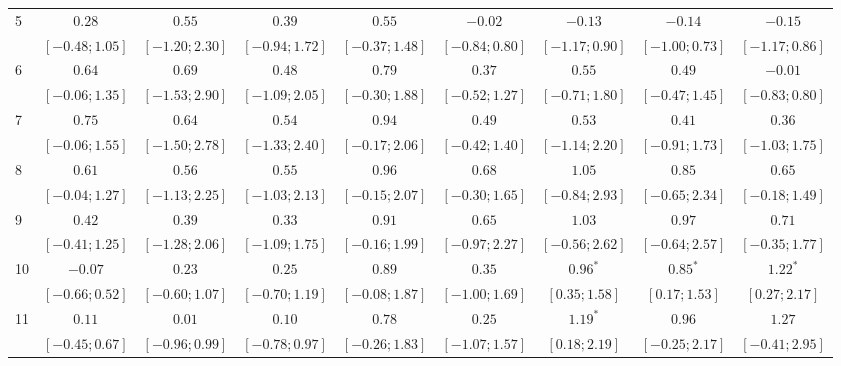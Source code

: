 \documentclass[12pt]{amsart}
\begin{document}
\begin{table}
\begin{adjustbox}{width=\textwidth}
\begin{tabular}{l c c c c | c c c c}
5  & $0.28$           & $0.55$           & $0.39$           & $0.55$           & $-0.02$          & $-0.13$          & $-0.14$          & $-0.15$          \\
   & $ [-0.48; 1.05]$ & $ [-1.20; 2.30]$ & $ [-0.94; 1.72]$ & $ [-0.37; 1.48]$ & $ [-0.84; 0.80]$ & $ [-1.17; 0.90]$ & $ [-1.00; 0.73]$ & $ [-1.17; 0.86]$ \\
6  & $0.64$           & $0.69$           & $0.48$           & $0.79$           & $0.37$           & $0.55$           & $0.49$           & $-0.01$          \\
   & $ [-0.06; 1.35]$ & $ [-1.53; 2.90]$ & $ [-1.09; 2.05]$ & $ [-0.30; 1.88]$ & $ [-0.52; 1.27]$ & $ [-0.71; 1.80]$ & $ [-0.47; 1.45]$ & $ [-0.83; 0.80]$ \\
7  & $0.75$           & $0.64$           & $0.54$           & $0.94$           & $0.49$           & $0.53$           & $0.41$           & $0.36$           \\
   & $ [-0.06; 1.55]$ & $ [-1.50; 2.78]$ & $ [-1.33; 2.40]$ & $ [-0.17; 2.06]$ & $ [-0.42; 1.40]$ & $ [-1.14; 2.20]$ & $ [-0.91; 1.73]$ & $ [-1.03; 1.75]$ \\
8  & $0.61$           & $0.56$           & $0.55$           & $0.96$           & $0.68$           & $1.05$           & $0.85$           & $0.65$           \\
   & $ [-0.04; 1.27]$ & $ [-1.13; 2.25]$ & $ [-1.03; 2.13]$ & $ [-0.15; 2.07]$ & $ [-0.30; 1.65]$ & $ [-0.84; 2.93]$ & $ [-0.65; 2.34]$ & $ [-0.18; 1.49]$ \\
9  & $0.42$           & $0.39$           & $0.33$           & $0.91$           & $0.65$           & $1.03$           & $0.97$           & $0.71$           \\
   & $ [-0.41; 1.25]$ & $ [-1.28; 2.06]$ & $ [-1.09; 1.75]$ & $ [-0.16; 1.99]$ & $ [-0.97; 2.27]$ & $ [-0.56; 2.62]$ & $ [-0.64; 2.57]$ & $ [-0.35; 1.77]$ \\
10 & $-0.07$          & $0.23$           & $0.25$           & $0.89$           & $0.35$           & $0.96^{*}$       & $0.85^{*}$       & $1.22^{*}$       \\
   & $ [-0.66; 0.52]$ & $ [-0.60; 1.07]$ & $ [-0.70; 1.19]$ & $ [-0.08; 1.87]$ & $ [-1.00; 1.69]$ & $ [ 0.35; 1.58]$ & $ [ 0.17; 1.53]$ & $ [ 0.27; 2.17]$ \\
11 & $0.11$           & $0.01$           & $0.10$           & $0.78$           & $0.25$           & $1.19^{*}$       & $0.96$           & $1.27$           \\
   & $ [-0.45; 0.67]$ & $ [-0.96; 0.99]$ & $ [-0.78; 0.97]$ & $ [-0.26; 1.83]$ & $ [-1.07; 1.57]$ & $ [ 0.18; 2.19]$ & $ [-0.25; 2.17]$ & $ [-0.41; 2.95]$ \\

\end{tabular}
\end{adjustbox}
\end{table}
\end{document}
